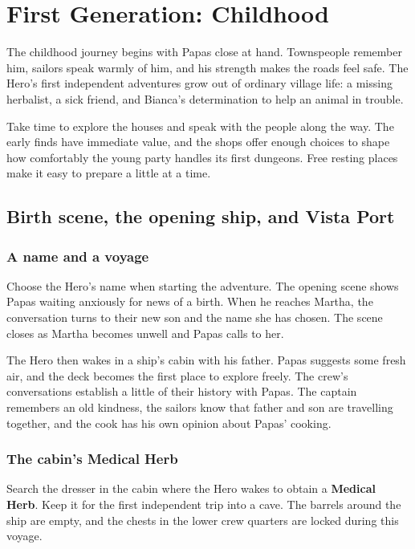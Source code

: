 \chapter{First Generation: Childhood}
\label{written-childhood}

The childhood journey begins with Papas close at hand. Townspeople remember
him, sailors speak warmly of him, and his strength makes the roads feel
safe. The Hero's first independent adventures grow out of ordinary village
life: a missing herbalist, a sick friend, and Bianca's determination to help
an animal in trouble.

Take time to explore the houses and speak with the people along the way.
The early finds have immediate value, and the shops offer enough choices
to shape how comfortably the young party handles its first dungeons.
Free resting places make it easy to prepare a little at a time.

\section{Birth scene, the opening ship, and Vista Port}

\subsection*{A name and a voyage}

Choose the Hero's name when starting the adventure. The opening scene
shows Papas waiting anxiously for news of a birth. When he reaches Martha,
the conversation turns to their new son and the name she has chosen.
The scene closes as Martha becomes unwell and Papas calls to her.

The Hero then wakes in a ship's cabin with his father. Papas suggests
some fresh air, and the deck becomes the first place to explore freely.
The crew's conversations establish a little of their history with Papas.
The captain remembers an old kindness, the sailors know that father and
son are travelling together, and the cook has his own opinion about Papas'
cooking.

\subsection*{The cabin's Medical Herb}

Search the dresser in the cabin where the Hero wakes to obtain a
\textbf{Medical Herb}. Keep it for the first independent trip into a cave.
The barrels around the ship are empty, and the chests in the lower crew
quarters are locked during this voyage.

